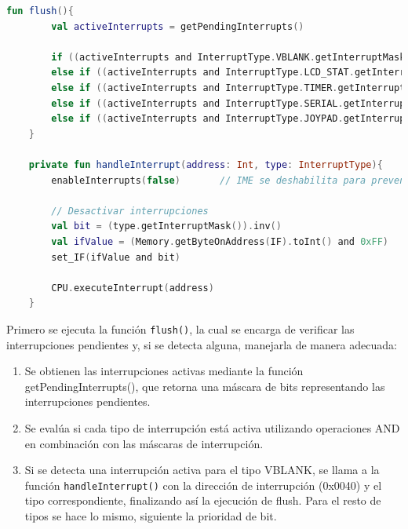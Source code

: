 \begin{lstlisting}[language=Kotlin, caption={Lógica principal del módulo Interrupt.}, label={code:interruptlogic}]
    fun flush(){
        val activeInterrupts = getPendingInterrupts()

        if ((activeInterrupts and InterruptType.VBLANK.getInterruptMask()) != 0)        return handleInterrupt(VBLANK_PTR, InterruptType.VBLANK)
        else if ((activeInterrupts and InterruptType.LCD_STAT.getInterruptMask()) != 0) return handleInterrupt(LCD_STAT_PTR, InterruptType.LCD_STAT)
        else if ((activeInterrupts and InterruptType.TIMER.getInterruptMask()) != 0)    return handleInterrupt(TIMER_PTR, InterruptType.TIMER)
        else if ((activeInterrupts and InterruptType.SERIAL.getInterruptMask()) != 0)   return handleInterrupt(SERIAL_PTR, InterruptType.SERIAL)
        else if ((activeInterrupts and InterruptType.JOYPAD.getInterruptMask()) != 0)   return handleInterrupt(JOYPAD_PTR, InterruptType.JOYPAD)
    }

    private fun handleInterrupt(address: Int, type: InterruptType){
        enableInterrupts(false)       // IME se deshabilita para prevenir que otras interrupciones se ejecuten

        // Desactivar interrupciones
        val bit = (type.getInterruptMask()).inv()
        val ifValue = (Memory.getByteOnAddress(IF).toInt() and 0xFF)
        set_IF(ifValue and bit)

        CPU.executeInterrupt(address)
    }
\end{lstlisting}

Primero se ejecuta la función \texttt{flush()}, la cual se encarga de verificar las interrupciones pendientes y, si se detecta alguna, manejarla de manera adecuada:

\begin{enumerate}
    \item Se obtienen las interrupciones activas mediante la función getPendingInterrupts(), que retorna una máscara de bits representando las interrupciones pendientes.
    \item Se evalúa si cada tipo de interrupción está activa utilizando operaciones AND en combinación con las máscaras de interrupción.
    \item Si se detecta una interrupción activa para el tipo VBLANK, se llama a la función \texttt{handleInterrupt()} con la dirección de interrupción (0x0040) y el tipo correspondiente, finalizando así la ejecución de flush. Para el resto de tipos se hace lo mismo, siguiente la prioridad de bit.
\end{enumerate}

